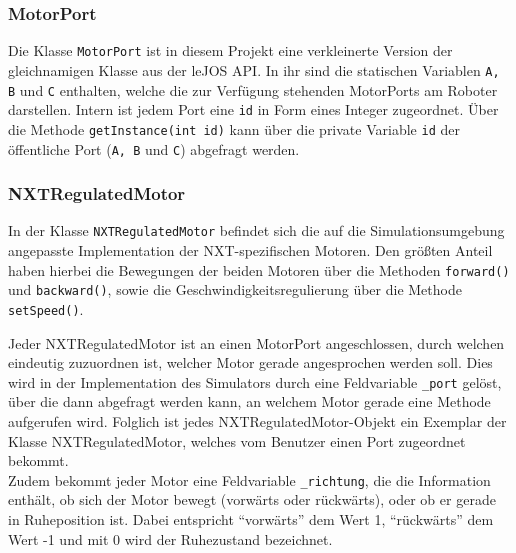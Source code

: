 \documentclass[paper=a4, DIV=calc, BCOR=12mm, twoside=on, onecolumn=on, open = right, titlepage =on, parskip =half-, headsepline = on, footsepline = off, chapterprefix = off, appendixprefix = on, fontsize = 12pt, numbers = noenddot, abstract = on]{scrbook}
\begin{document}
\subsubsection{MotorPort}
Die Klasse \texttt{MotorPort} ist in diesem Projekt eine verkleinerte Version der gleichnamigen Klasse aus der leJOS API. In ihr sind die statischen Variablen \texttt{A, B} und \texttt{C} enthalten, welche die zur Verfügung stehenden MotorPorts am Roboter darstellen. Intern ist jedem Port eine \texttt{id} in Form eines Integer zugeordnet. Über die Methode \texttt{get\-In\-stance(int id)} kann über die private Variable \texttt{id} der öffentliche Port (\texttt{A, B} und \texttt{C}) abgefragt werden.

\subsubsection{NXTRegulatedMotor}
In der Klasse \texttt{NXTRegulatedMotor} befindet sich die auf die Simulationsumgebung angepasste Implementation der NXT-spezifischen Motoren. Den größten Anteil haben hierbei die Bewegungen der beiden Motoren über die Methoden \texttt{for\-ward()} und \texttt{back\-ward()}, sowie die Geschwindigkeitsregulierung über die Methode \texttt{set\-Speed()}. 

Jeder NXTRegulatedMotor ist an einen MotorPort angeschlossen, durch welchen eindeutig zuzuordnen ist, welcher Motor gerade angesprochen werden soll. Dies wird in der Implementation des Simulators durch eine Feldvariable \texttt{{\_}port} gelöst, über die dann abgefragt werden kann, an welchem Motor gerade eine Methode aufgerufen wird. Folglich ist jedes NXT\-Regulated\-Motor\--Objekt ein Exemplar der Klasse NXTRegulatedMotor, welches vom Benutzer einen Port zugeordnet bekommt.\\
Zudem bekommt jeder Motor eine Feldvariable \texttt{{\_}richtung}, die die Information enthält, ob sich der Motor bewegt (vorwärts oder rückwärts), oder ob er gerade in Ruheposition ist. Dabei entspricht "`vorwärts"' dem Wert 1, "`rückwärts"' dem Wert -1 und mit 0 wird der Ruhezustand bezeichnet.
\end{document}
